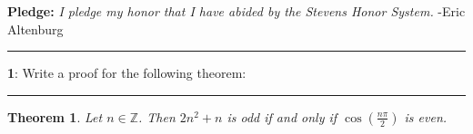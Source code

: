 \documentclass[11pt]{article}
\newtheorem{theorem}{Theorem}
\newcommand\question[2]{\vspace{.25in}\hrule\textbf{#1}: #2\vspace{.5em}\hrule\vspace{.10in}}
\newcommand{\Z}{\mathbb{Z}}
\begin{document}
\raggedright
\newcommand\NAME{Eric Altenburg}  %
\newcommand\COURSE{MA-240}
\newcommand\HWNUM{2 Corrections}              %


\textbf{Pledge:} \textit{I pledge my honor that I have abided by the Stevens Honor System.} -Eric Altenburg

\question{1}{Write a proof for the following theorem:}

\begin{theorem}
	Let $n \in \Z$. Then $2n^2+n$ is odd if and only if $\cos(\frac{n \pi}{2})$ is even.
\end{theorem}
\end{document}

